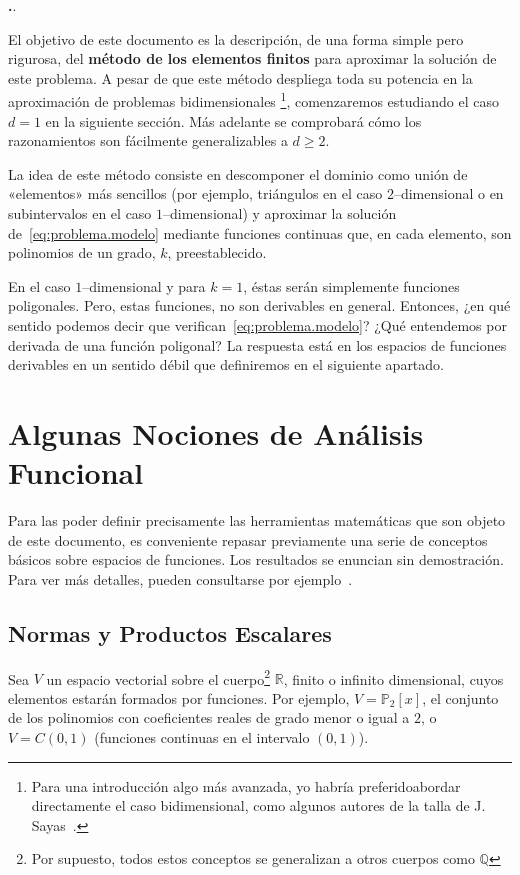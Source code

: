 \documentclass[11pt]{article}
\theoremstyle{plain}
\theoremstyle{definition}
\newcounter{stepnum}[section]
\newcommand{\step}{\bigskip\noindent\textbf{\thesection.\refstepcounter{stepnum}\thestepnum}.\enspace}
\newcommand{\Q}{\ensuremath{\mathbb{Q}}}
\newcommand{\R}{\ensuremath{\mathbb{R}}}
\renewcommand{\P}{\ensuremath{\mathbb{P}}}
\begin{document}
\step

El objetivo de este documento es la descripción,  de una forma simple pero rigurosa, del \textbf{método de los elementos finitos} para aproximar la solución de este problema. 
A pesar de que este método despliega toda su potencia en la aproximación de problemas bidimensionales%
\footnote{Para una introducción algo más avanzada, yo habría preferidoabordar directamente el caso bidimensional, como algunos autores de la talla de J. Sayas~\cite{sayas2008gentle}.}, %
comenzaremos estudiando el caso $d=1$ en la siguiente sección. Más adelante se comprobará cómo los razonamientos son fácilmente generalizables  a $d\geq 2$.

La idea de este método consiste en descomponer el dominio como unión de «elementos» más sencillos (por ejemplo, triángulos en el caso $2$--dimensional o en subintervalos en el caso $1$--dimensional) y aproximar la solución de~\eqref{eq:problema.modelo} mediante funciones continuas que, en cada elemento, son polinomios de un grado, $k$, preestablecido. 

En el caso $1$--dimensional y para $k=1$, éstas serán simplemente funciones poligonales. Pero, estas funciones, no son derivables en general. Entonces, ¿en qué sentido podemos decir que verifican~\eqref{eq:problema.modelo}? ¿Qué entendemos por derivada de una función poligonal? La respuesta está en los espacios de funciones derivables en un sentido débil que definiremos en el siguiente apartado.

\section{Algunas Nociones de Análisis Funcional}
\label{sec:análisis.funcional}

Para las poder definir precisamente las herramientas matemáticas que son objeto de este documento, es conveniente repasar previamente una serie de conceptos básicos sobre espacios de funciones. Los resultados se enuncian sin demostración. Para ver más detalles, pueden consultarse por ejemplo~\cite{adams2003sobolev, sayas2019variational}.

\subsection*{Normas y Productos Escalares}
Sea $V$ un espacio vectorial sobre el cuerpo\footnote{Por supuesto, todos estos conceptos se generalizan a otros cuerpos como $\Q$} $\R$, finito o infinito dimensional, cuyos elementos estarán formados por funciones. Por ejemplo, $V=\P_2[x]$, el conjunto de los polinomios con coeficientes reales de grado menor o igual a $2$, o $V=C(0,1)$ (funciones continuas en el intervalo $(0,1)$). 
\end{document}
